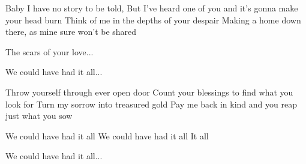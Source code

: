 \documentclass[../../../songbook.tex]{subfiles}
\begin{document}
Baby I have no story to be told, \newline
But I've heard one of you and it's gonna make your head burn \newline
Think of me in the depths of your despair \newline
Making a home down there, as mine sure won't be shared \newline

\-\hspace{1cm} The scars of your love... \newline

\-\hspace{1cm} We could have had it all... \newline

Throw yourself through ever open door \newline
Count your blessings to find what you look for \newline
Turn my sorrow into treasured gold \newline
Pay me back in kind and you reap just what you sow \newline

\-\hspace{1cm} We could have had it all \newline
\-\hspace{1cm} We could have had it all  \newline
\-\hspace{1cm} It all \newline

\-\hspace{1cm} We could have had it all... \newline
\end{document}
